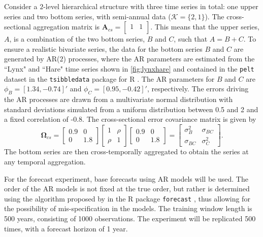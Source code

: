 \documentclass[a4paper,11pt]{article}
\newcommand{\Avet}{\bm{A}}
\newcommand{\Omegavet}{\bm{\Omega}}
\theoremstyle{definition}
\begin{document}
Consider a $2$-level hierarchical structure with three time series in total: one upper series and two bottom series, with semi-annual data ($\mathcal{K} = \{2,1\}$). The cross-sectional aggregation matrix is
$
	\Avet_{cs} = \begin{bmatrix}
		1 & 1 \\
	\end{bmatrix}
$.
This means that the upper series, $A$, is a combination of the two bottom series, $B$ and $C$, such that $A = B+C$.
To ensure a realistic bivariate series, the data for the bottom series $B$ and $C$ are generated by AR($2$) processes, where the AR parameters are estimated from the “Lynx" and “Hare" time series shown in \autoref{fig:lynxhare} and contained in the \texttt{pelt} dataset in the \texttt{tsibbledata} package for R \citep{ohara-wild2022}. The AR parameters for $B$ and $C$ are
$\phi_B = [1.34, -0.74]'$ and $\phi_C = [0.95, -0.42]'$, respectively. The errors driving the AR processes are drawn from a multivariate normal distribution with standard deviations simulated from a uniform distribution between 0.5 and 2 and a fixed correlation of -0.8. The cross-sectional error covariance matrix is given by
$$
	\Omegavet_{cs} = \begin{bmatrix}
		0.9 & 0   \\
		0   & 1.8
	\end{bmatrix} \begin{bmatrix}
		1    & \rho \\
		\rho & 1
	\end{bmatrix} \begin{bmatrix}
		0.9 & 0   \\
		0   & 1.8
	\end{bmatrix} = \begin{bmatrix}
		\sigma_B^2  & \sigma_{BC} \\
		\sigma_{BC} & \sigma_C^2
	\end{bmatrix}.
$$
The bottom series are then cross-temporally aggregated to obtain the series at any temporal aggregation.

For the forecast experiment, base forecasts using AR models will be used. The order of the AR models is not fixed at the true order, but rather is determined using the algorithm proposed by \cite{hyndman2008a} in the R package \texttt{forecast} \citep{Rforecast}, thus allowing for the possibility of mis-specification in the models. The training window length is 500 years, consisting of 1000 observations. The experiment will be replicated 500 times, with a forecast horizon of 1 year.
\end{document}
